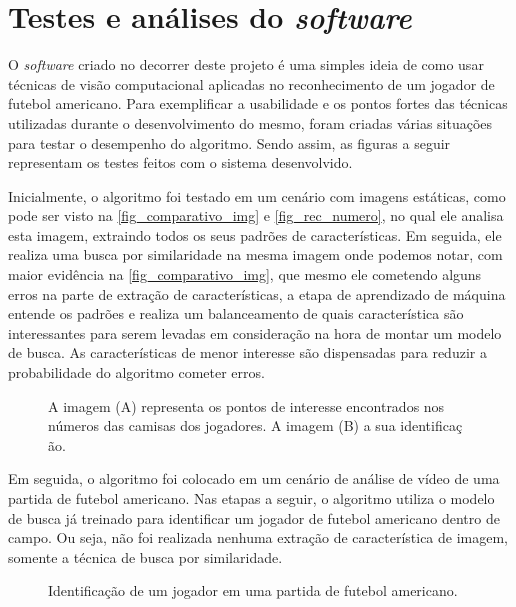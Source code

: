 \section{\textbf{Testes e análises do \textit{software}}}
\label{testes_do_software}
O \textit{software} criado no decorrer deste projeto é uma simples ideia de como usar técnicas de visão computacional aplicadas no reconhecimento de um jogador de futebol americano. Para exemplificar a usabilidade e os pontos fortes das técnicas utilizadas durante o desenvolvimento do mesmo, foram criadas várias situações para testar o desempenho do algoritmo. Sendo assim, as figuras a seguir representam os testes feitos com o sistema desenvolvido.

Inicialmente, o algoritmo foi testado em um cenário com imagens estáticas, como pode ser visto na \autoref{fig_comparativo_img} e \autoref{fig_rec_numero}, no qual ele analisa esta imagem, extraindo todos os seus padrões de características. Em seguida, ele realiza uma busca por similaridade na mesma imagem onde podemos notar, com maior evidência na  \autoref{fig_comparativo_img}, que mesmo ele cometendo alguns erros na parte de extração de características, a etapa de aprendizado de máquina entende os padrões e realiza um balanceamento de quais característica são interessantes para serem levadas em consideração na hora de montar um modelo de busca. As características de menor interesse são dispensadas para reduzir a probabilidade do algoritmo cometer erros.

\begin{figure}[ht]
	\caption{\label{fig_rec_numero}A imagem (A) representa os pontos de interesse encontrados nos números das camisas dos jogadores. A imagem (B) a sua identificaç ão.}
	\begin{center}
	\end{center}
	\centering {}
\end{figure}

Em seguida, o algoritmo foi colocado em um cenário de análise de vídeo de uma partida de futebol americano. Nas etapas a seguir, o algoritmo utiliza o modelo de busca já treinado para identificar um jogador de futebol americano dentro de campo. Ou seja, não foi realizada nenhuma extração de característica de imagem, somente a técnica de busca por similaridade.


\begin{figure}[ht]
	\caption{\label{fig_rep_jogador_em_campo}Identificação de um jogador em uma partida de futebol americano.}
	\begin{center}
	\end{center}
	\centering {}
\end{figure}

